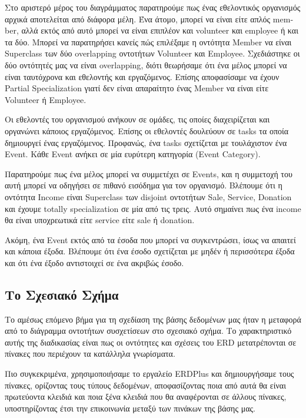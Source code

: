 \documentclass[manuscript,screen,review]{acmart}
\newcommand{\en}[1]{\foreignlanguage{english}{#1}}
\begin{document}
Στο αριστερό μέρος του διαγράμματος παρατηρούμε πως ένας εθελοντικός οργανισμός αρχικά αποτελείται από διάφορα μέλη. Ένα άτομο, μπορεί να είναι είτε απλός \en{member}, αλλά εκτός από αυτό μπορεί να είναι επιπλέον και \en{volunteer} και \en{employee} ή και τα δύο. Μπορεί να παρατηρήσει κανείς πώς επιλέξαμε η οντότητα \en{Member} να είναι \en{Superclass} των δύο  \en{overlapping} οντοτήτων \en{Volunteer} και \en{Employee}. Σχεδιάστηκε οι δύο οντότητές μας να είναι \en{overlapping}, διότι θεωρήσαμε ότι ένα μέλος μπορεί να είναι ταυτόχρονα και εθελοντής και εργαζόμενος. Επίσης αποφασίσαμε να έχουν \en{Partial Specialization} γιατί δεν είναι απαραίτητο ένας \en{Member} να είναι είτε \en{Volunteer } ή \en{Employee}.

Οι εθελοντές του οργανισμού ανήκουν σε ομάδες, τις οποίες διαχειρίζεται και οργανώνει κάποιος εργαζόμενος. Επίσης οι εθελοντές δουλεύουν σε \en{tasks} τα οποία δημιουργεί ένας εργαζόμενος.
Προφανώς, ένα \en{tasks} σχετίζεται με τουλάχιστον ένα \en{Event}. Κάθε \en{Event} ανήκει σε μία ευρύτερη κατηγορία (\en{Event Category}).

Παρατηρούμε πως ένα μέλος μπορεί να συμμετέχει σε \en{Events}, και η συμμετοχή του αυτή μπορεί να οδηγήσει σε πιθανό εισόδημα για τον οργανισμό. Βλέπουμε ότι η οντότητα \en{Income} είναι \en{Superclass} των \en{disjoint} οντοτήτων \en{Sale, Service, Donation} και έχουμε \en{totally specialization} σε μία από τις τρεις. Αυτό σημαίνει πως ένα \en{income} θα είναι υποχρεωτικά είτε \en{service} είτε \en{sale} ή \en{donation}.

Ακόμη, ένα \en{Event} εκτός από τα έσοδα που μπορεί να συγκεντρώσει, ίσως να απαιτεί και κάποια έξοδα. Βλέπουμε ότι ένα έσοδο σχετίζεται με μηδέν ή περισσότερα έξοδα και ότι ένα έξοδο αντιστοιχεί σε ένα ακριβώς έσοδο.

\subsection{Το Σχεσιακό Σχήμα}

Το αμέσως επόμενο βήμα για τη σχεδίαση της βάσης δεδομένων μας ήταν η μεταφορά
από το διάγραμμα οντοτήτων συσχετίσεων στο σχεσιακό σχήμα. Το χαρακτηριστικό
αυτής της διαδικασίας είναι πως οι οντότητες και σχέσεις του \en{ERD}
μετατρέπονται σε πίνακες που περιέχουν τα κατάλληλα γνωρίσματα.

Πιο συγκεκριμένα, χρησιμοποιήσαμε το εργαλείο \en{ERDPlus} και δημιουργήσαμε τους πίνακες, ορίζοντας τους τύπους δεδομένων, αποφασίζοντας ποια από αυτά θα είναι πρωτεύοντα κλειδιά και ποια 
ξένα κλειδιά που θα αναφέρονται σε άλλους πίνακες, υποστηρίζοντας έτσι την επικοινωνία μεταξύ των πινάκων της βάσης μας. 
\end{document}
